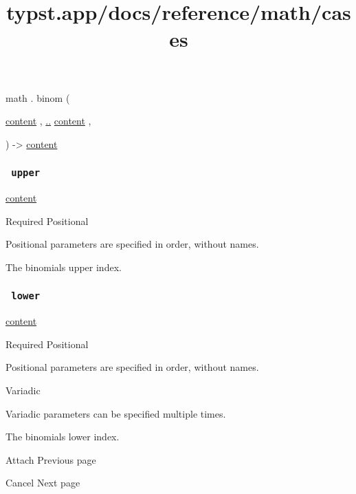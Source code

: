 math { . } { binom } (

{ \href{/docs/reference/foundations/content/}{content} , } {
\hyperref[parameters-lower]{..}
\href{/docs/reference/foundations/content/}{content} , }

) -\textgreater{} \href{/docs/reference/foundations/content/}{content}

\subsubsection{\texorpdfstring{\texttt{\ upper\ }}{ upper }}\label{parameters-upper}

\href{/docs/reference/foundations/content/}{content}

{Required} {{ Positional }}

\label{parameters-upper-positional-tooltip}
Positional parameters are specified in order, without names.

The binomial\textquotesingle s upper index.

\subsubsection{\texorpdfstring{\texttt{\ lower\ }}{ lower }}\label{parameters-lower}

\href{/docs/reference/foundations/content/}{content}

{Required} {{ Positional }}

\label{parameters-lower-positional-tooltip}
Positional parameters are specified in order, without names.

{{ Variadic }}

\label{parameters-lower-variadic-tooltip}
Variadic parameters can be specified multiple times.

The binomial\textquotesingle s lower index.

\href{/docs/reference/math/attach/}{\pandocbounded{}}

{ Attach } { Previous page }

\href{/docs/reference/math/cancel/}{\pandocbounded{}}

{ Cancel } { Next page }


\title{typst.app/docs/reference/math/cases}

